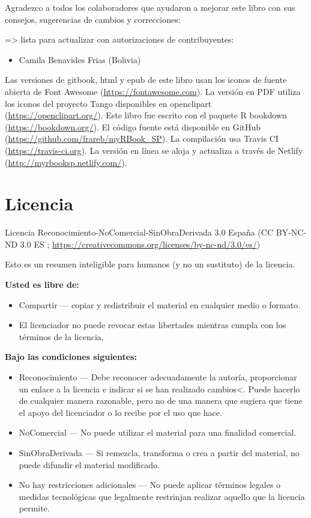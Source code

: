 \documentclass[]{book}
\providecommand{\tightlist}{%
  \setlength{\itemsep}{0pt}\setlength{\parskip}{0pt}}
\begin{document}
Agradezco a todos los colaboradores que ayudaron a mejorar este libro
con sus consejos, sugerencias de cambios y correcciones:

=\textgreater{} lista para actualizar con autorizaciones de
contribuyentes:

\begin{itemize}
\tightlist
\item
  Camila Benavides Frias (Bolivia)
\end{itemize}

Las versiones de gitbook, html y epub de este libro usan los iconos de
fuente abierta de Font Awesome (\url{https://fontawesome.com}). La
versión en PDF utiliza los iconos del proyecto Tango disponibles en
openclipart (\url{https://openclipart.org/}). Este libro fue escrito con
el paquete R bookdown (\url{https://bookdown.org/}). El código fuente
está disponible en GitHub (\url{https://github.com/frareb/myRBook_SP}).
La compilación usa Travis CI (\url{https://travis-ci.org}). La versión
en línea se aloja y actualiza a través de Netlify
(\url{http://myrbooksp.netlify.com/}).

\chapter{Licencia}\label{licence}

Licencia Reconocimiento-NoComercial-SinObraDerivada 3.0 España (CC
BY-NC-ND 3.0 ES ;
\url{https://creativecommons.org/licenses/by-nc-nd/3.0/es/})

Esto es un resumen inteligible para humanos (y no un sustituto) de la
licencia.

\textbf{Usted es libre de:}

\begin{itemize}
\tightlist
\item
  Compartir --- copiar y redistribuir el material en cualquier medio o
  formato.
\item
  El licenciador no puede revocar estas libertades mientras cumpla con
  los términos de la licencia.
\end{itemize}

\textbf{Bajo las condiciones siguientes:}

\begin{itemize}
\item
  Reconocimiento --- Debe reconocer adecuadamente la autoría,
  proporcionar un enlace a la licencia e indicar si se han realizado
  cambios\textless{}. Puede hacerlo de cualquier manera razonable, pero
  no de una manera que sugiera que tiene el apoyo del licenciador o lo
  recibe por el uso que hace.
\item
  NoComercial --- No puede utilizar el material para una finalidad
  comercial.
\item
  SinObraDerivada --- Si remezcla, transforma o crea a partir del
  material, no puede difundir el material modificado.
\item
  No hay restricciones adicionales --- No puede aplicar términos legales
  o medidas tecnológicas que legalmente restrinjan realizar aquello que
  la licencia permite.
\end{itemize}
\end{document}

